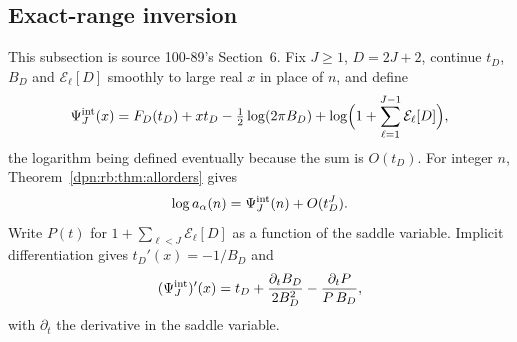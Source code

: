 \documentclass[11pt]{article}
\numberwithin{equation}{section}
\theoremstyle{definition}\newtheorem{definition}[theorem]{Definition}
\theoremstyle{remark}\newtheorem{remark}[theorem]{Remark}
\begin{document}
\subsection{Exact-range inversion}\label{dpn:rb:sec:inverse}
This subsection is source 100-89's Section~6.  Fix $J\ge1$, $D=2J+2$, continue
$t_D$, $B_D$ and $\mathcal E_\ell[D]$ smoothly to large real $x$ in place of
$n$, and define
\begin{equation}\label{dpn:rb:eq:Psiint}
 \Psi^{\rm int}_J(x)=F_D(t_D)+xt_D-\tfrac12\log(2\pi B_D)
                         +\log\Bigl(1+\sum_{\ell=1}^{J-1}\mathcal E_\ell[D]\Bigr),
\end{equation}
the logarithm being defined eventually because the sum is $O(t_D)$.  For
integer $n$, Theorem~\ref{dpn:rb:thm:allorders} gives
\begin{equation}\label{dpn:rb:eq:logerror}
 \log a_\alpha(n)=\Psi^{\rm int}_J(n)+O(t_D^{J}).
\end{equation}
Write $P(t)$ for $1+\sum_{\ell<J}\mathcal E_\ell[D]$ as a function of the saddle
variable.  Implicit differentiation gives $t_D'(x)=-1/B_D$ and
\begin{equation}\label{dpn:rb:eq:Psiprime}
 (\Psi^{\rm int}_J)'(x)=t_D+\frac{\partial_tB_D}{2B_D^2}-\frac{\partial_tP}{P\,B_D},
\end{equation}
with $\partial_t$ the derivative in the saddle variable.
\end{document}

